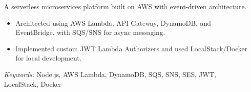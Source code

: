 \nointent
{}

\nointent
A serverless microservices platform built on AWS with event-driven architecture.
\begin{itemize}
    \item Architected using AWS Lambda, API Gateway, DynamoDB, and EventBridge, with SQS/SNS for async messaging.
    \item Implemented custom JWT Lambda Authorizers and used LocalStack/Docker for local development.
\end{itemize}

\nointent
\textit{Keywords:} Node.js, AWS Lambda, DynamoDB, SQS, SNS, SES, JWT, LocalStack, Docker

